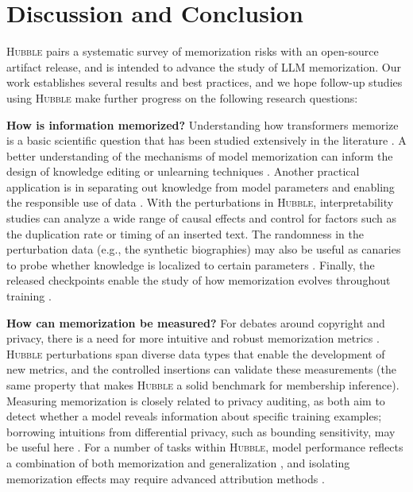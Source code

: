 \section{Discussion and Conclusion}
\label{sec:discussion}

\textsc{Hubble} pairs a systematic survey of memorization risks with an open-source artifact release, and is intended to advance the study of LLM memorization. Our work establishes several results and best practices, and we hope follow-up studies using \textsc{Hubble} make further progress on the following research questions:

\textbf{How is information memorized?} Understanding how transformers memorize is a basic scientific question that has been studied extensively in the literature \citep[][among others]{geva-etal-2021-transformer, dai-etal-2022-knowledge}. A better understanding of the mechanisms of model memorization can inform the design of knowledge editing or unlearning techniques \citep{meng2022locating}. Another practical application is in separating out knowledge from model parameters and enabling the responsible use of data \citep{shi2025flexolmoopenlanguagemodels, ghosal2025memorizationsinksisolatingmemorization}. With the perturbations in \textsc{Hubble}, interpretability studies can analyze a wide range of causal effects and control for factors such as the duplication rate or timing of an inserted text. The randomness in the perturbation data (e.g., the synthetic biographies) may also be useful as canaries to probe whether knowledge is localized to certain parameters \citep{maini_can_2023,chang-etal-2024-localization}. Finally, the released checkpoints enable the study of how memorization evolves throughout training \citep{biderman2023emergent, chang2024large}.

\textbf{How can memorization be measured?} For debates around copyright and privacy, there is a need for more intuitive and robust memorization metrics \citep[][as an example]{schwarzchild_rethinking_2024}. \textsc{Hubble} perturbations span diverse data types that enable the development of new metrics, and the controlled insertions can validate these measurements (the same property that makes \textsc{Hubble} a solid benchmark for membership inference). Measuring memorization is closely related to privacy auditing, as both aim to detect whether a model reveals information about specific training examples; borrowing intuitions from differential privacy, such as bounding sensitivity, may be useful here \citep{panda2025privacy}. For a number of tasks within \textsc{Hubble}, model performance reflects a combination of both memorization and generalization \citep{feldman_what_2020}, and isolating memorization effects may require advanced attribution methods \citep{ilyas_datamodels_2022,grosse2023studyinglargelanguagemodel}.

